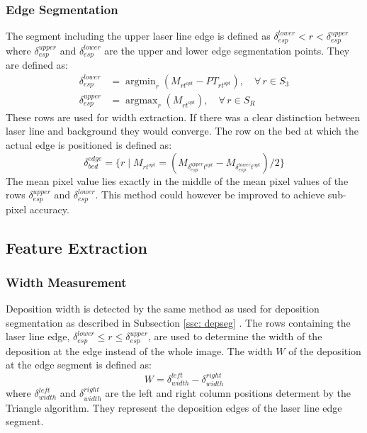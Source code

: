 \documentclass[10pt,letter]{article}
\DeclareMathOperator*{\argmax}{argmax}
\DeclareMathOperator*{\argmin}{argmin}
\begin{document}
\subsubsection{Edge Segmentation}
The segment including the upper laser line edge is defined as $\delta^{lower}_{esp} < r < \delta^{upper}_{esp}$ where $\delta^{upper}_{esp}$ and $\delta^{lower}_{esp}$ are the upper and lower edge segmentation points. They are defined as:
\begin{align}
\delta^{lower}_{esp} &= \argmin_r ( M_{rt^{opt}} - PT_{rt^{opt}} ), \quad \forall \, r \in S_3 \\
\delta^{upper}_{esp} &= \argmax_r ( M_{rt^{opt}} ), \quad \forall \, r \in S_R
\end{align}
These rows are used for width extraction. If there was a clear distinction between laser line and background they would converge. The row on the bed at which the actual edge is positioned is defined as:
\begin{equation}
\delta^{edge}_{bed} = \{r \mid M_{rt^{opt}} =( M_{\delta^{upper}_{esp}t^{opt}} - M_{\delta^{lower}_{esp}t^{opt}}) / 2 \}
\end{equation}
The mean pixel value lies exactly in the middle of the mean pixel values of the rows $\delta^{upper}_{esp}$ and $\delta^{lower}_{esp}$. This method could however be improved to achieve sub-pixel accuracy.

\subsection{Feature Extraction}
\subsubsection{Width Measurement}
Deposition width is detected by the same method as used for deposition segmentation as described in Subsection \ref{ssc: depseg} . The rows containing the laser line edge, $\delta^{lower}_{esp} \leq r \leq \delta^{upper}_{esp}$, are used to determine the width of the deposition at the edge instead of the whole image. The width $W$ of the deposition at the edge segment is defined as:
\begin{equation}
W = \delta^{left}_{width}-\delta^{right}_{width}
\end{equation}
where $\delta^{left}_{width}$ and $\delta^{right}_{width}$ are the left and right column positions determent by the Triangle algorithm. They represent the deposition edges of the laser line edge segment. 
\end{document}
